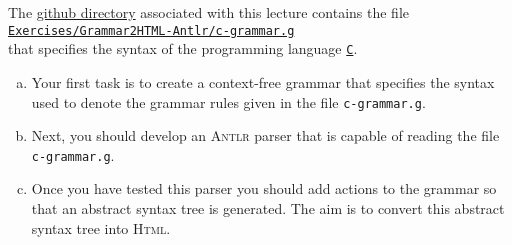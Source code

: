 \vspace*{\fill}
\pagebreak


\exerciseEng
The \href{https://github.com/karlstroetmann/Formal-Languages}{github directory} associated with this lecture
contains the file
\\[0.2cm]
\hspace*{1.3cm}
\href{https://github.com/karlstroetmann/Formal-Languages/tree/master/Exercises/Grammar2HTML-Antlr/c-grammar.g}{
\texttt{Exercises/Grammar2HTML-Antlr/c-grammar.g}}
\\[0.2cm]
that specifies the syntax of the programming language 
\href{https://en.wikipedia.org/wiki/C_(programming_language)}{\texttt{C}}.

\begin{enumerate}[(a)]
\item Your first task is to create a context-free grammar that specifies the syntax used to denote the grammar
      rules given in the file \texttt{c-grammar.g}.  
\item Next, you should develop an \textsc{Antlr} parser that is capable of reading the file
      \texttt{c-grammar.g}.
\item Once you have tested this parser you should add actions to the grammar
      so that an abstract syntax tree is generated.  The aim is to convert this abstract syntax tree
      into \textsc{Html}. 
\end{enumerate}

